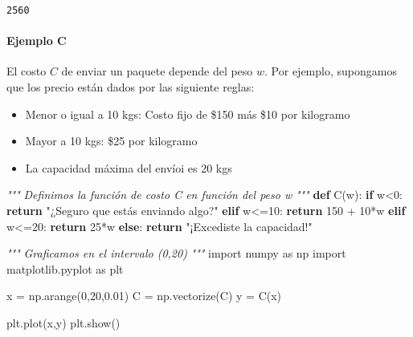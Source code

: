 \documentclass[
]{article}
\newenvironment{Shaded}{}{}
\newcommand{\CommentTok}[1]{\textcolor[rgb]{0.38,0.63,0.69}{\textit{#1}}}
\newcommand{\ControlFlowTok}[1]{\textcolor[rgb]{0.00,0.44,0.13}{\textbf{#1}}}
\newcommand{\DecValTok}[1]{\textcolor[rgb]{0.25,0.63,0.44}{#1}}
\newcommand{\FloatTok}[1]{\textcolor[rgb]{0.25,0.63,0.44}{#1}}
\newcommand{\ImportTok}[1]{#1}
\newcommand{\KeywordTok}[1]{\textcolor[rgb]{0.00,0.44,0.13}{\textbf{#1}}}
\newcommand{\NormalTok}[1]{#1}
\newcommand{\OperatorTok}[1]{\textcolor[rgb]{0.40,0.40,0.40}{#1}}
\newcommand{\StringTok}[1]{\textcolor[rgb]{0.25,0.44,0.63}{#1}}
\begin{document}
\begin{verbatim}
2560
\end{verbatim}

\hypertarget{ejemplo-c}{%
\paragraph{Ejemplo C}\label{ejemplo-c}}

El costo \(C\) de enviar un paquete depende del peso \(w\). Por ejemplo,
supongamos que los precio están dados por las siguiente reglas:

\begin{itemize}
\item
  Menor o igual a 10 kgs: Costo fijo de \$150 más \$10 por kilogramo
\item
  Mayor a 10 kgs: \$25 por kilogramo
\item
  La capacidad máxima del envíoi es 20 kgs
\end{itemize}

\begin{Shaded}
\begin{Highlighting}[]
\CommentTok{"""}
\CommentTok{Definimos la función de costo C en función del peso w}
\CommentTok{"""}
\KeywordTok{def}\NormalTok{ C(w):}
    \ControlFlowTok{if}\NormalTok{ w}\OperatorTok{\textless{}}\DecValTok{0}\NormalTok{:}
        \ControlFlowTok{return} \StringTok{"¿Seguro que estás enviando algo?"}
    \ControlFlowTok{elif}\NormalTok{ w}\OperatorTok{\textless{}=}\DecValTok{10}\NormalTok{:}
        \ControlFlowTok{return} \DecValTok{150} \OperatorTok{+} \DecValTok{10}\OperatorTok{*}\NormalTok{w}
    \ControlFlowTok{elif}\NormalTok{ w}\OperatorTok{\textless{}=}\DecValTok{20}\NormalTok{:}
        \ControlFlowTok{return} \DecValTok{25}\OperatorTok{*}\NormalTok{w}
    \ControlFlowTok{else}\NormalTok{:}
        \ControlFlowTok{return} \StringTok{"¡Excediste la capacidad!"}    
\end{Highlighting}
\end{Shaded}

\begin{Shaded}
\begin{Highlighting}[]
\CommentTok{"""}
\CommentTok{Graficamos en el intervalo (0,20)}
\CommentTok{"""}
\ImportTok{import}\NormalTok{ numpy }\ImportTok{as}\NormalTok{ np}
\ImportTok{import}\NormalTok{ matplotlib.pyplot }\ImportTok{as}\NormalTok{ plt}

\NormalTok{x }\OperatorTok{=}\NormalTok{ np.arange(}\DecValTok{0}\NormalTok{,}\DecValTok{20}\NormalTok{,}\FloatTok{0.01}\NormalTok{)}
\NormalTok{C }\OperatorTok{=}\NormalTok{ np.vectorize(C)}
\NormalTok{y }\OperatorTok{=}\NormalTok{ C(x)}

\NormalTok{plt.plot(x,y)}
\NormalTok{plt.show()}
\end{Highlighting}
\end{Shaded}
\end{document}
